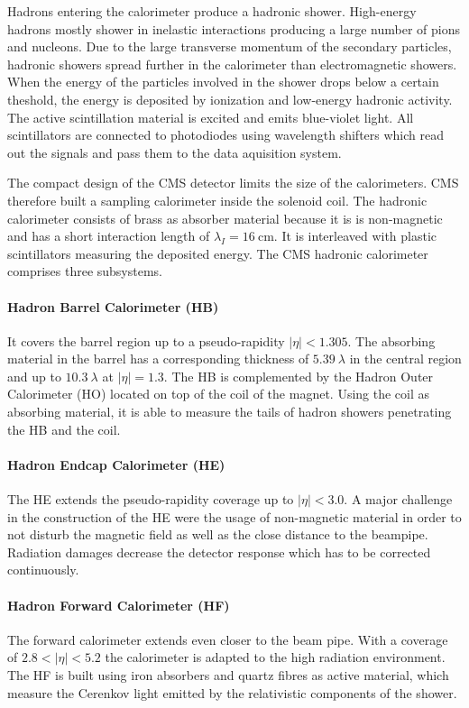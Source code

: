 Hadrons entering the calorimeter produce a hadronic shower. High-energy
hadrons mostly shower in inelastic interactions producing a large number of pions
and nucleons. Due to the large transverse momentum of the secondary particles,
hadronic showers spread further in the calorimeter than electromagnetic showers.
When the energy of the particles involved in the shower drops below a certain
theshold, the energy is deposited by ionization and low-energy hadronic
activity. The active scintillation material is excited and emits blue-violet
light. All scintillators are connected to photodiodes using wavelength
shifters which read out the signals and pass them to the data aquisition system.

The compact design of the CMS detector limits the size of the calorimeters. CMS
therefore built a sampling calorimeter inside the solenoid coil. The hadronic
calorimeter consists of brass as absorber material because it is is non-magnetic and
has a short interaction length of $\lambda_I = \SI{16}{\centi\metre}$. It is
interleaved with plastic scintillators measuring the deposited energy. The CMS
hadronic calorimeter comprises three subsystems. 

\paragraph{Hadron Barrel Calorimeter (HB)}
It covers the barrel region up to a pseudo-rapidity $|\eta| < 1.305$. The
absorbing material in the barrel has a corresponding thickness of
$\SI{5.39}{\lambda}$ in the central region and up to $\SI{10.3}{\lambda}$ at $|\eta|
= 1.3$. The HB is complemented by the Hadron Outer Calorimeter (HO) located on
top of the coil of the magnet. Using the coil as absorbing material, it is able
to measure the tails of hadron showers penetrating the HB and the coil.

\paragraph{Hadron Endcap Calorimeter (HE)} The HE extends the pseudo-rapidity
coverage up to $|\eta| < 3.0$. A major challenge in the construction of the HE
were the usage of non-magnetic material in order to not disturb the magnetic field as
well as the close distance to the beampipe. Radiation damages decrease the
detector response which has to be corrected continuously. 

\paragraph{Hadron Forward Calorimeter (HF)} 
The forward calorimeter extends even closer to the beam pipe. With a coverage of
$2.8 < |\eta| < 5.2$ the calorimeter is adapted to the high radiation
environment. The HF is built using iron absorbers and quartz fibres as active
material, which measure the Cerenkov light emitted by the relativistic
components of the shower.

